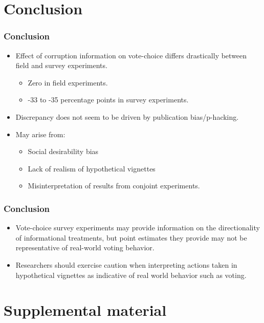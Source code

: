 \documentclass[usenames,dvipsnames]{beamer}
\begin{document}
\section{Conclusion}

\begin{frame}
\frametitle{Conclusion}
\begin{itemize}
\pause
\item Effect of corruption information on vote-choice \textcolor{Cerulean}{differs drastically} between field and survey experiments.
\begin{itemize}
\pause
\item \textcolor{Cerulean}{Zero} in field experiments.
\item \textcolor{Cerulean}{-33 to -35 percentage points} in survey experiments. 
\end{itemize}
\pause
\item Discrepancy does not seem to be driven by publication bias/p-hacking.
\pause
\item May arise from:
\begin{itemize} 
\pause
\item Social desirability bias
\pause
\item Lack of realism of hypothetical vignettes 
\pause
\item Misinterpretation of results from conjoint experiments.
\end{itemize}
\end{itemize}
\end{frame}


\begin{frame}
\frametitle{Conclusion}
\begin{itemize}
\item Vote-choice survey experiments may provide information on the directionality of informational treatments, but point estimates they provide may not be representative of real-world voting behavior. 
\pause
\item Researchers should exercise caution when interpreting actions taken in hypothetical vignettes as indicative of real world behavior such as voting. 
\end{itemize}

\end{frame}

\appendix

\section{Supplemental material}
\end{document}
